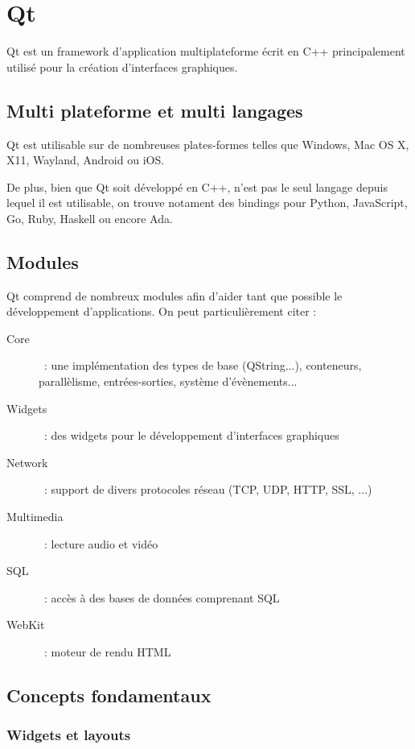 \section{Qt}

Qt est un framework d'application multiplateforme écrit en C++ principalement utilisé pour la création d'interfaces graphiques.

\subsection{Multi plateforme et multi langages}

Qt est utilisable sur de nombreuses plates-formes telles que Windows, Mac OS X, X11, Wayland, Android ou iOS.

De plus, bien que Qt soit développé en C++, n'est pas le seul langage depuis lequel il est utilisable, on trouve notament des bindings pour Python, JavaScript, Go, Ruby, Haskell ou encore Ada.

\subsection{Modules}

Qt comprend de nombreux modules afin d'aider tant que possible le développement d'applications.
On peut particulièrement citer :
\begin{description}
	\item[Core]~: une implémentation des types de base (QString...), conteneurs, parallèlisme, entrées-sorties, système d'évènements...
	\item[Widgets]~: des widgets pour le développement d'interfaces graphiques
	\item[Network]~: support de divers protocoles réseau (TCP, UDP, HTTP, SSL, ...)
	\item[Multimedia]~: lecture audio et vidéo
	\item[SQL]~: accès à des bases de données comprenant SQL
	\item[WebKit]~: moteur de rendu HTML
\end{description}

\subsection{Concepts fondamentaux}

\subsubsection{Widgets et layouts}

